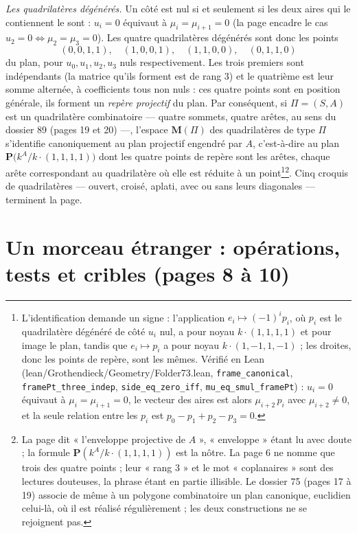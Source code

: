 \documentclass[11pt,a4paper]{article}
\begin{document}
\emph{Les quadrilatères dégénérés.} Un côté est nul si et seulement si les deux
aires qui le contiennent le sont : $u_i = 0$ équivaut à
$\mu_i = \mu_{i+1} = 0$ (la page encadre le cas $u_2 = 0 \iff \mu_2 = \mu_3 =
0$). Les quatre quadrilatères dégénérés sont donc les points
\[
  (0,0,1,1), \quad (1,0,0,1), \quad (1,1,0,0), \quad (0,1,1,0)
\]
du plan, pour $u_0, u_1, u_2, u_3$ nuls respectivement. Les trois premiers
sont indépendants (la matrice qu'ils forment est de rang 3) et le quatrième est
leur somme alternée, à coefficients tous non nuls : ces quatre points sont en
position générale, ils forment un \emph{repère projectif} du plan. Par
conséquent, si $\Pi = (S, A)$ est un quadrilatère combinatoire --- quatre
sommets, quatre arêtes, au sens du dossier 89 (pages 19 et 20) ---, l'espace
$\mathbf{M}(\Pi)$ des quadrilatères de type $\Pi$ s'identifie canoniquement au
plan projectif engendré par $A$, c'est-à-dire au plan
$\mathbf{P}\bigl(k^{A} / k\cdot(1,1,1,1)\bigr)$ dont les quatre points de
repère sont les arêtes, chaque arête correspondant au quadrilatère où elle est
réduite à un point\footnote{L'identification demande un signe :
l'application $e_i \mapsto (-1)^i p_i$, où $p_i$ est le quadrilatère dégénéré
de côté $u_i$ nul, a pour noyau $k\cdot(1,1,1,1)$ et pour image le plan,
tandis que $e_i \mapsto p_i$ a pour noyau $k\cdot(1,-1,1,-1)$ ; les droites,
donc les points de repère, sont les mêmes. Vérifié en Lean
(lean/Grothendieck/Geometry/Folder73.lean, \texttt{frame\_canonical},
\texttt{framePt\_three\_indep}, \texttt{side\_eq\_zero\_iff},
\texttt{mu\_eq\_smul\_framePt}) : $u_i = 0$ équivaut à
$\mu_i = \mu_{i+1} = 0$, le vecteur des aires est alors $\mu_{i+2}\, p_i$ avec
$\mu_{i+2} \neq 0$, et la seule relation entre les $p_i$ est
$p_0 - p_1 + p_2 - p_3 = 0$.}\footnote{La page dit « l'enveloppe projective de $A$ »,
« enveloppe » étant lu avec doute ; la formule
$\mathbf{P}(k^{A}/k\cdot(1,1,1,1))$ est la nôtre. La page 6 ne nomme que trois
des quatre points ; leur « rang 3 » et le mot « coplanaires » sont des lectures
douteuses, la phrase étant en partie illisible. Le dossier 75 (pages 17 à 19)
associe de même à un polygone combinatoire un plan canonique, euclidien
celui-là, où il est réalisé régulièrement ; les deux constructions ne se
rejoignent pas.}. Cinq croquis de quadrilatères --- ouvert, croisé, aplati,
avec ou sans leurs diagonales --- terminent la page.

\section*{Un morceau étranger : opérations, tests et cribles (pages 8 à 10)}
\end{document}
